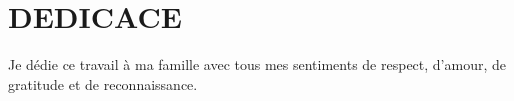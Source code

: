 \chapter*{DEDICACE}
\vspace*{7cm}
\begin{cursive}
	{\Huge Je dédie ce travail à ma famille avec tous mes sentiments de respect, d'amour, de gratitude et de
		reconnaissance.}
\end{cursive}